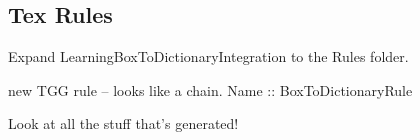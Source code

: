 \newpage
\hypertarget{rules tex}{}
\subsection{Tex Rules}
\texHeader

Expand LearningBoxToDictionaryIntegration to the Rules folder.

new TGG rule -- looks like a chain. Name :: BoxToDictionaryRule

Look at all the stuff that's generated!